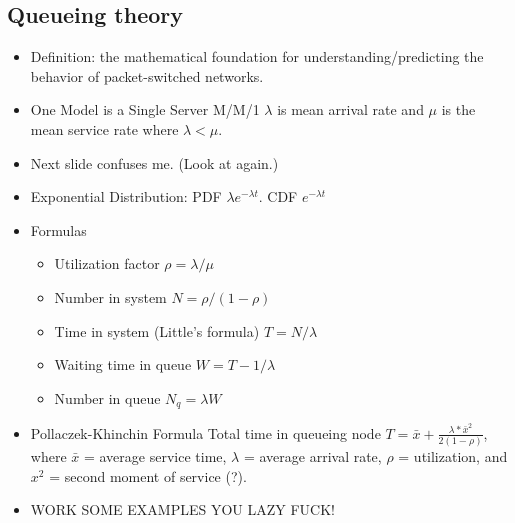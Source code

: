 \documentclass{scrartcl}
\begin{document}
\subsection*{Queueing theory}
\begin{itemize}
\item Definition: the mathematical foundation for
understanding/predicting the behavior of packet-switched networks.
\item One Model is a Single Server M/M/1 $\lambda$ is mean arrival rate and
$\mu$ is the mean service rate where $\lambda < \mu$.
\item Next slide confuses me. (Look at again.)
\item Exponential Distribution: PDF $\lambda e^{-\lambda t}$. CDF
$e^{-\lambda t}$
\item Formulas
\begin{itemize}
\item Utilization factor $\rho = \lambda/\mu$
\item Number in system $N = \rho / (1-\rho)$
\item Time in system (Little's formula) $T=N/\lambda$
\item Waiting time in queue $W=T-1/\lambda$
\item Number in queue $N_q = \lambda W$
\end{itemize}
\item Pollaczek-Khinchin Formula Total time in queueing node $T = \bar{x} +
\frac{\lambda * \bar{x}^2}{2(1-\rho)}$, where $\bar{x}$ = average service time,
$\lambda$ = average arrival rate, $\rho$ = utilization, and $x^2$ = second
moment of service (?).
\item WORK SOME EXAMPLES YOU LAZY FUCK!
\end{itemize}
\end{document}

